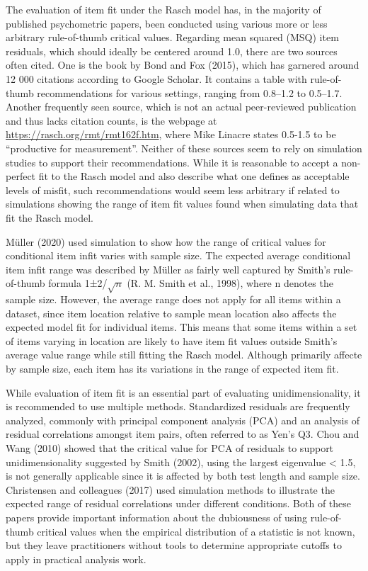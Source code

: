 \documentclass[
  letterpaper,
  DIV=11,
  numbers=noendperiod]{scrartcl}
\begin{document}
The evaluation of item fit under the Rasch model has, in the majority of
published psychometric papers, been conducted using various more or less
arbitrary rule-of-thumb critical values. Regarding mean squared (MSQ)
item residuals, which should ideally be centered around 1.0, there are
two sources often cited. One is the book by Bond and Fox (2015), which
has garnered around 12 000 citations according to Google Scholar. It
contains a table with rule-of-thumb recommendations for various
settings, ranging from 0.8--1.2 to 0.5--1.7. Another frequently seen
source, which is not an actual peer-reviewed publication and thus lacks
citation counts, is the webpage at
\url{https://rasch.org/rmt/rmt162f.htm}, where Mike Linacre states
0.5-1.5 to be ``productive for measurement''. Neither of these sources
seem to rely on simulation studies to support their recommendations.
While it is reasonable to accept a non-perfect fit to the Rasch model
and also describe what one defines as acceptable levels of misfit, such
recommendations would seem less arbitrary if related to simulations
showing the range of item fit values found when simulating data that fit
the Rasch model.

Müller (2020) used simulation to show how the range of critical values
for conditional item infit varies with sample size. The expected average
conditional item infit range was described by Müller as fairly well
captured by Smith's rule-of-thumb formula 1±2/\(\sqrt{n}\) (R. M. Smith
et al., 1998), where n denotes the sample size. However, the average
range does not apply for all items within a dataset, since item location
relative to sample mean location also affects the expected model fit for
individual items. This means that some items within a set of items
varying in location are likely to have item fit values outside Smith's
average value range while still fitting the Rasch model. Although
primarily affecte by sample size, each item has its variations in the
range of expected item fit.

While evaluation of item fit is an essential part of evaluating
unidimensionality, it is recommended to use multiple methods.
Standardized residuals are frequently analyzed, commonly with principal
component analysis (PCA) and an analysis of residual correlations
amongst item pairs, often referred to as Yen's Q3. Chou and Wang (2010)
showed that the critical value for PCA of residuals to support
unidimensionality suggested by Smith (2002), using the largest
eigenvalue \textless{} 1.5, is not generally applicable since it is
affected by both test length and sample size. Christensen and colleagues
(2017) used simulation methods to illustrate the expected range of
residual correlations under different conditions. Both of these papers
provide important information about the dubiousness of using
rule-of-thumb critical values when the empirical distribution of a
statistic is not known, but they leave practitioners without tools to
determine appropriate cutoffs to apply in practical analysis work.
\end{document}
